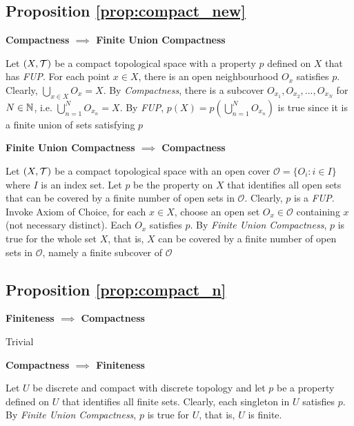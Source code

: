 \documentclass{article}
\begin{document}
\subsection{Proposition \ref{prop:compact_new}}

\textbf{Compactness $\implies$ Finite Union Compactness}

Let $(X, \mathcal{T})$ be a compact topological space with a property $p$ defined on $X$ that has \emph{FUP}. For each point $x \in X$, there is an open neighbourhood $O_x$ satisfies $p$. Clearly, $\bigcup_{x \in X} O_x = X$. By \emph{Compactness}, there is a subcover $O_{x_1}, O_{x_2}, ..., O_{x_N}$ for $N \in \mathbb{N}$, i.e. $\bigcup_{n=1}^N O_{x_n} = X$. By \emph{FUP}, $p(X) = p(\bigcup_{n=1}^N O_{x_n})$ is true since it is a finite union of sets satisfying $p$


\textbf{Finite Union Compactness $\implies$ Compactness}

Let $(X, \mathcal{T})$ be a compact topological space with an open cover $\mathcal{O} = \{O_i: i \in I\}$ where $I$ is an index set. Let $p$ be the property on $X$ that identifies all open sets that can be covered by a finite number of open sets in $\mathcal{O}$. Clearly, $p$ is a \emph{FUP}.
Invoke Axiom of Choice, for each $x \in X$, choose an open set $O_x \in \mathcal{O}$ containing $x$ (not necessary distinct). Each $O_x$ satisfies $p$. By \emph{Finite Union Compactness}, $p$ is true for the whole set $X$, that is, $X$ can be covered by a finite number of open sets in $\mathcal{O}$, namely a finite subcover of $\mathcal{O}$


\subsection{Proposition \ref{prop:compact_n}} 

\textbf{Finiteness $\implies$ Compactness}

Trivial

\textbf{Compactness $\implies$ Finiteness}

Let $U$ be discrete and compact with discrete topology and let $p$ be a property defined on $U$ that identifies all finite sets. Clearly, each singleton in $U$ satisfies $p$. By \emph{Finite Union Compactness}, $p$ is true for $U$, that is, $U$ is finite.



\end{document}
